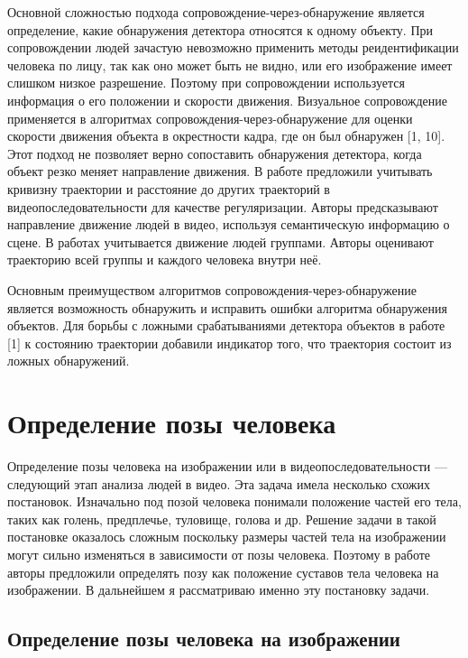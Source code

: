 Основной сложностью подхода сопровождение-через-обнаружение является определение, какие обнаружения детектора относятся к одному объекту. При сопровождении людей зачастую невозможно применить методы реидентификации человека по лицу, так как оно может быть не видно, или его изображение имеет слишком низкое разрешение. Поэтому при сопровождении используется информация о его положении и скорости движения. Визуальное сопровождение применяется в алгоритмах сопровождения-через-обнаружение для оценки скорости движения объекта в окрестности кадра, где он был обнаружен [1, 10]. Этот подход не позволяет верно сопоставить обнаружения детектора, когда объект резко меняет направление движения. В работе \cite{milan2013detection} предложили учитывать кривизну траектории и расстояние до других траекторий в видеопоследовательности для качестве регуляризации. Авторы \cite{gong2011multi} предсказывают направление движение людей в видео, используя семантическую информацию о сцене. В работах \cite{leal2011everybody,choi2012unified} учитывается движение людей группами. Авторы оценивают траекторию всей группы и каждого человека внутри неё.

Основным преимуществом алгоритмов сопровождения-через-обнаружение является возможность обнаружить и исправить ошибки алгоритма обнаружения объектов. Для борьбы с ложными срабатываниями детектора объектов в работе [1] к состоянию траектории добавили индикатор того, что траектория состоит из ложных обнаружений. 

\section{Определение позы человека}

Определение позы человека на изображении или в видеопоследовательности --- следующий этап анализа людей в видео. Эта задача имела несколько схожих постановок. Изначально под позой человека понимали положение частей его тела, таких как голень, предплечье, туловище, голова и др. Решение задачи в такой постановке оказалось сложным поскольку размеры частей тела на изображении могут сильно изменяться в зависимости от позы человека. Поэтому в работе \cite{yang2011articulated} авторы предложили определять позу как положение суставов тела человека на изображении. В дальнейшем я рассматриваю именно эту постановку задачи.

\subsection{Определение позы человека на изображении}

